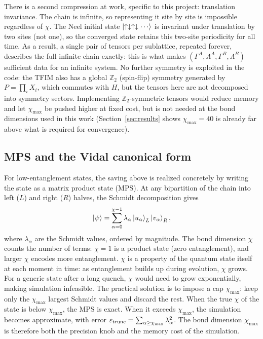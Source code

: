 \documentclass[11pt,a4paper]{article}
\begin{document}
There is a second compression at work, specific to this project: translation
invariance. The chain is infinite, so representing it site by site is
impossible regardless of $\chi$. The Neel initial state $\ket{\uparrow
\downarrow \uparrow \downarrow \cdots}$ is invariant under translation by two
sites (not one), so the converged state retains this two-site periodicity for
all time. As a result, a single pair of tensors per sublattice, repeated
forever, describes the full infinite chain exactly: this is what makes
$(\Gamma^A,\Lambda^A,\Gamma^B,\Lambda^B)$ sufficient data for an infinite
system. No further symmetry is exploited in the code: the TFIM also has a
global $\mathbb{Z}_2$ (spin-flip) symmetry generated by $P = \prod_i X_i$,
which commutes with $H$, but the tensors here are not decomposed into
symmetry sectors. Implementing $\mathbb{Z}_2$-symmetric tensors would reduce
memory and let $\chi_{\max}$ be pushed higher at fixed cost, but is not needed
at the bond dimensions used in this work (Section~\ref{sec:results} shows
$\chi_{\max}=40$ is already far above what is required for convergence).

\subsection{MPS and the Vidal canonical form}

For low-entanglement states, the saving above is realized concretely by
writing the state as a matrix product state (MPS). At any bipartition of the
chain into left ($L$) and right ($R$) halves, the Schmidt decomposition gives
\begin{equation}
  \ket{\psi} = \sum_{\alpha=0}^{\chi-1} \lambda_\alpha \ket{u_\alpha}_L \ket{v_\alpha}_R,
  \label{eq:schmidt}
\end{equation}
where $\lambda_\alpha$ are the Schmidt values, ordered by magnitude. The bond
dimension $\chi$ counts the number of terms: $\chi=1$ is a product state (zero
entanglement), and larger $\chi$ encodes more entanglement. $\chi$ is a
property of the quantum state itself at each moment in time: as
entanglement builds up during evolution, $\chi$ grows. For a generic state
after a long quench, $\chi$ would need to grow exponentially, making simulation
infeasible. The practical solution is to impose a cap $\chi_{\max}$: keep only
the $\chi_{\max}$ largest Schmidt values and discard the rest. When the true
$\chi$ of the state is below $\chi_{\max}$, the MPS is exact. When it
exceeds $\chi_{\max}$, the simulation becomes approximate, with error
$\varepsilon_{\rm trunc} = \sum_{\alpha \geq \chi_{\max}} \lambda_\alpha^2$.
The bond dimension $\chi_{\max}$ is therefore both the precision knob and the
memory cost of the simulation.
\end{document}
